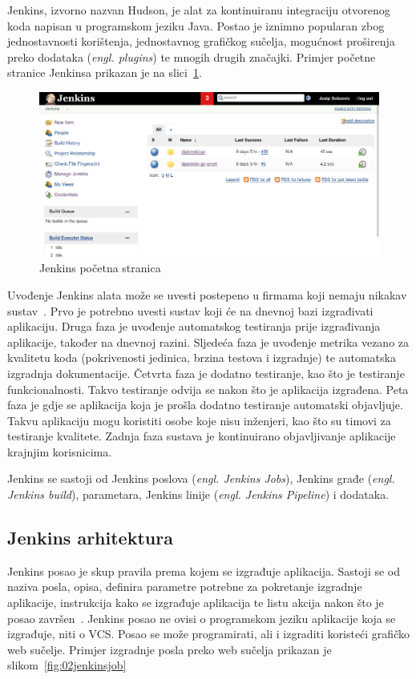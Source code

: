 Jenkins, izvorno nazvan Hudson, je alat za kontinuiranu integraciju otvorenog koda napisan u
programskom jeziku Java. Postao je iznimno popularan zbog jednostavnosti korištenja, jednostavnog
grafičkog sučelja, mogućnost proširenja preko dodataka (\textit{engl. plugins}) te mnogih drugih
značajki. Primjer početne stranice Jenkinsa prikazan je na slici~\ref{fig:02jenkins_home}.

\begin{figure}[h]
    \centering
    \includegraphics[width=\textwidth]{img/02/jenkins_home.png}
    \caption{Jenkins početna stranica}%
    \label{fig:02jenkins_home}
\end{figure}

Uvođenje Jenkins alata može se uvesti postepeno u firmama koji nemaju nikakav
sustav~\citep{smart2011jenkins}. Prvo je potrebno uvesti sustav koji će na dnevnoj bazi izgrađivati
aplikaciju. Druga faza je uvođenje automatskog testiranja prije izgrađivanja aplikacije, također na
dnevnoj razini. Sljedeća faza je uvođenje metrika vezano za kvalitetu koda (pokrivenosti jedinica,
brzina testova i izgradnje) te automatska izgradnja dokumentacije. Četvrta faza je dodatno
testiranje, kao što je testiranje funkcionalnosti. Takvo testiranje odvija se nakon što je
aplikacija izgrađena. Peta faza je gdje se aplikacija koja je prošla dodatno testiranje automatski
objavljuje. Takvu aplikaciju mogu koristiti osobe koje nisu inženjeri, kao što su timovi za
testiranje kvalitete. Zadnja faza sustava je kontinuirano objavljivanje aplikacije krajnjim
korisnicima.

Jenkins se sastoji od Jenkins poslova (\textit{engl. Jenkins Jobs}), Jenkins građe (\textit{engl.
Jenkins build}), parametara, Jenkins linije (\textit{engl. Jenkins Pipeline}) i dodataka.

\subsection{Jenkins arhitektura}
Jenkins posao je skup pravila prema kojem se izgrađuje aplikacija. Sastoji se od naziva posla,
opisa, definira parametre potrebne za pokretanje izgradnje aplikacije, instrukcija kako se izgrađuje
aplikacija te listu akcija nakon što je posao završen~\citep{pathania2016learning}. Jenkins posao ne
ovisi o programskom jeziku aplikacije koja se izgrađuje, niti o VCS. Posao se može programirati, ali
i izgraditi koristeći grafičko web sučelje. Primjer izgradnje posla preko web sučelja prikazan je
slikom~\ref{fig:02jenkinsjob}

